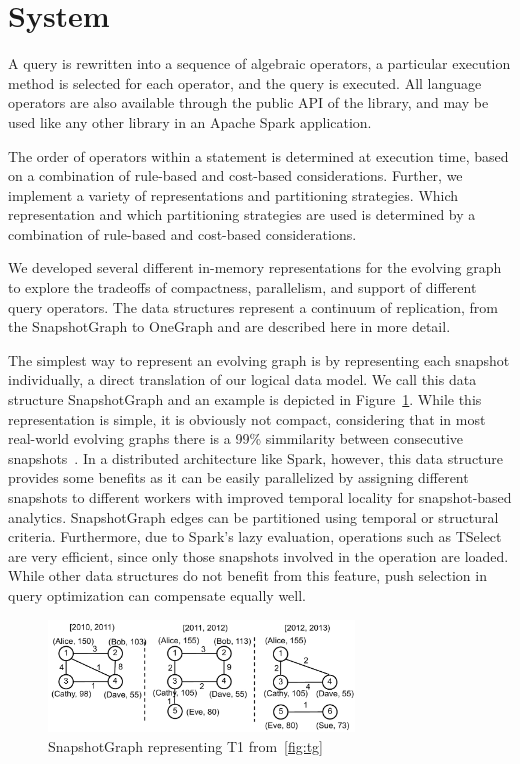 \section{System}
\label{sec:sys}

A \ql query is rewritten into a sequence of algebraic operators, a
particular execution method is selected for each operator, and the
query is executed.  All language operators are also available through
the public API of the \ql library, and may be used like any other
library in an Apache Spark application.

The order of operators within a \ql statement is determined at
execution time, based on a combination of rule-based and cost-based
considerations.  Further, we implement a variety of \tg
representations and partitioning strategies.  Which representation and
which partitioning strategies are used is determined by a combination
of rule-based and cost-based considerations.

We developed several different in-memory representations for the
evolving graph to explore the tradeoffs of compactness, parallelism,
and support of different query operators.  The data structures
represent a continuum of replication, from the SnapshotGraph to
OneGraph and are described here in more detail.

The simplest way to represent an evolving graph is by representing
each snapshot individually, a direct translation of our logical data
model.  We call this data structure SnapshotGraph and an example is
depicted in Figure~\ref{fig:sgp}.  While this representation is
simple, it is obviously not compact, considering that in most
real-world evolving graphs there is a 99\% simmilarity between
consecutive snapshots~\cite{?}.  In a distributed architecture like
Spark, however, this data structure provides some benefits as it can
be easily parallelized by assigning different snapshots to different
workers with improved temporal locality for snapshot-based analytics.
SnapshotGraph edges can be partitioned using temporal or structural
criteria.  Furthermore, due to Spark's lazy evaluation, operations
such as TSelect are very efficient, since only those snapshots
involved in the operation are loaded.  While other data structures do
not benefit from this feature, push selection in query optimization
can compensate equally well.

\begin{figure}[t!]
\includegraphics[width=3.2in]{figs/sgp.pdf}
\caption{SnapshotGraph representing T1 from~\ref{fig:tg}}
\label{fig:sgp}
\end{figure}

